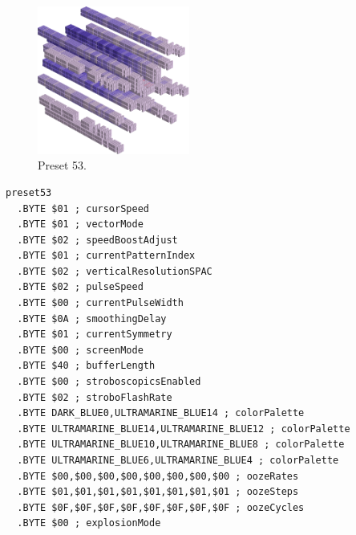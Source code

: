 \vspace*{-0.5cm}
\begin{minipage}[b]{0.48\linewidth}
\begin{figure}[H]                                                          
  \centering                                                             
  \begin{adjustbox}{width=5cm,center}                                   
  \includegraphics[width=5cm]{src/colorspace_presets/preset53-45.png}%
  \end{adjustbox}                                                        
\caption*{Preset 53.}                                           
\end{figure}                                                               
\end{minipage}
\hspace{0.1cm}
\begin{minipage}[b]{0.48\linewidth}                                                                         
\begin{lstlisting}[basicstyle=\ttfamily\tiny]
preset53
  .BYTE $01 ; cursorSpeed
  .BYTE $01 ; vectorMode
  .BYTE $02 ; speedBoostAdjust
  .BYTE $01 ; currentPatternIndex
  .BYTE $02 ; verticalResolutionSPAC
  .BYTE $02 ; pulseSpeed
  .BYTE $00 ; currentPulseWidth
  .BYTE $0A ; smoothingDelay
  .BYTE $01 ; currentSymmetry
  .BYTE $00 ; screenMode
  .BYTE $40 ; bufferLength
  .BYTE $00 ; stroboscopicsEnabled
  .BYTE $02 ; stroboFlashRate
  .BYTE DARK_BLUE0,ULTRAMARINE_BLUE14 ; colorPalette
  .BYTE ULTRAMARINE_BLUE14,ULTRAMARINE_BLUE12 ; colorPalette
  .BYTE ULTRAMARINE_BLUE10,ULTRAMARINE_BLUE8 ; colorPalette
  .BYTE ULTRAMARINE_BLUE6,ULTRAMARINE_BLUE4 ; colorPalette
  .BYTE $00,$00,$00,$00,$00,$00,$00,$00 ; oozeRates
  .BYTE $01,$01,$01,$01,$01,$01,$01,$01 ; oozeSteps
  .BYTE $0F,$0F,$0F,$0F,$0F,$0F,$0F,$0F ; oozeCycles
  .BYTE $00 ; explosionMode
\end{lstlisting}
\end{minipage}


